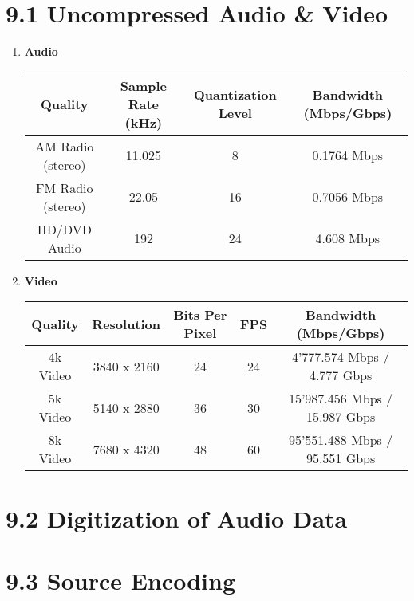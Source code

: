 \documentclass{article}
\begin{document}
	\pagestyle{fancy}
	
	\section*{9.1 Uncompressed Audio \& Video}
	\begin{adjustwidth}{2em}{2em}
		\begin{enumerate}
			\item \textbf{Audio} \\
			\begin{tabular}{|c|c|c|c|}
				\hline
				\textbf{Quality} & \textbf{Sample Rate (kHz)} & \textbf{Quantization Level} & \textbf{Bandwidth (Mbps/Gbps)} \\
				\hline
				AM Radio (stereo) & 11.025 & 8 & 0.1764 Mbps \\
				FM Radio (stereo) & 22.05 & 16 & 0.7056 Mbps \\
				HD/DVD Audio & 192 & 24 & 4.608 Mbps \\
				\hline
			\end{tabular}
			\item \textbf{Video} \\
			\begin{tabular}{|c|c|c|c|c|}
				\hline
				\textbf{Quality} & \textbf{Resolution} & \textbf{Bits Per Pixel} & \textbf{FPS} & \textbf{Bandwidth (Mbps/Gbps)} \\
				\hline
				4k Video & 3840 x 2160 & 24 & 24 & 4'777.574 Mbps / 4.777 Gbps \\
				5k Video & 5140 x 2880 & 36 & 30 & 15'987.456 Mbps / 15.987 Gbps \\
				8k Video & 7680 x 4320 & 48 & 60 & 95'551.488 Mbps / 95.551 Gbps \\
				\hline
			\end{tabular}
		\end{enumerate}
	\end{adjustwidth}
	
	\section*{9.2 Digitization of Audio Data}
	\begin{adjustwidth}{2em}{2em}
	\end{adjustwidth}
	
	\section*{9.3 Source Encoding}
	\begin{adjustwidth}{2em}{2em}
	\end{adjustwidth}
	
\end{document}
